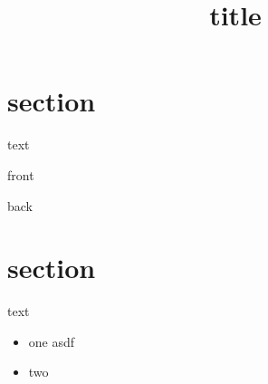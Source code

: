 \documentclass{article}
\title{title}
\begin{document}
\section{section}
text

\begin{tcolorbox}[colback=white!10!white,colframe=lightgray!75!black,
  savelowerto=\jobname_ex.tex]

  \begin{center}
    front


  \end{center}

  \tcblower

  \justifying
  back



\end{tcolorbox}


\section{section}
text


\begin{itemize}
	\item one
asdf
	\item two
\end{itemize}
\end{document}
